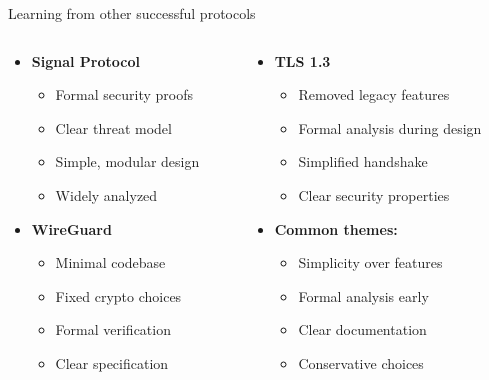 \documentclass[aspectratio=169, lualatex, handout]{beamer}
\begin{document}
\begin{frame}{Learning from other successful protocols}
	\begin{columns}[c]
		\begin{column}{0.5\textwidth}
			\begin{itemize}
				\item \textbf{Signal Protocol}
				      \begin{itemize}
					      \item Formal security proofs
					      \item Clear threat model
					      \item Simple, modular design
					      \item Widely analyzed
				      \end{itemize}
				\item \textbf{WireGuard}
				      \begin{itemize}
					      \item Minimal codebase
					      \item Fixed crypto choices
					      \item Formal verification
					      \item Clear specification
				      \end{itemize}
			\end{itemize}
		\end{column}
		\begin{column}{0.5\textwidth}
			\begin{itemize}
				\item \textbf{TLS 1.3}
				      \begin{itemize}
					      \item Removed legacy features
					      \item Formal analysis during design
					      \item Simplified handshake
					      \item Clear security properties
				      \end{itemize}
				\item \textbf{Common themes:}
				      \begin{itemize}
					      \item Simplicity over features
					      \item Formal analysis early
					      \item Clear documentation
					      \item Conservative choices
				      \end{itemize}
			\end{itemize}
		\end{column}
	\end{columns}
\end{frame}
\end{document}
